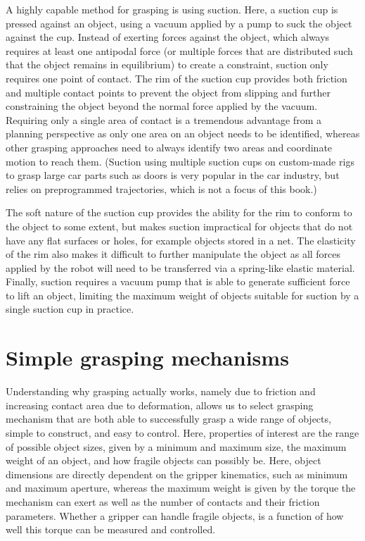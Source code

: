A highly capable method for grasping is using suction. Here, a suction cup is pressed against an object, using a vacuum applied by a pump to suck the object against the cup. Instead of exerting forces against the object, which always requires at least one antipodal force (or multiple forces that are distributed such that the object remains in equilibrium) to create a constraint, suction only requires one point of contact. The rim of the suction cup provides both friction and multiple contact points to prevent the object from slipping and further constraining the object beyond the normal force applied by the vacuum. Requiring only a single area of contact
is a tremendous advantage from a planning perspective as only one area on an object needs to be identified, whereas other grasping approaches need to always identify two areas and coordinate motion to reach them. (Suction using multiple suction cups on custom-made rigs to grasp large car parts such as doors is very popular in the car industry, but relies on preprogrammed trajectories, which is not a focus of this book.)

The soft nature of the suction cup provides the ability for the rim to conform to the object to some extent, but makes suction impractical for objects that do not have any flat surfaces or holes, for example objects stored in a net. The elasticity of the rim also makes it difficult to further manipulate the object as all forces applied by the robot will need to be transferred via a spring-like elastic material. Finally, suction requires a vacuum pump that is able to generate sufficient force to lift an object, limiting the maximum weight of objects suitable for suction by a single suction cup in practice.


\section{Simple grasping mechanisms}\label{sec:simplegrasp}
Understanding why grasping actually works, namely due to friction and increasing contact area due to deformation, allows us to select grasping mechanism that are both able to successfully grasp a wide range of objects, simple to construct, and easy to control. Here, properties of interest are the range of possible object sizes, given by a minimum and maximum size, the maximum weight of an object, and how fragile objects can possibly be. Here, object dimensions are directly dependent on the gripper kinematics, such as minimum and maximum aperture, whereas the maximum weight is given by the torque the mechanism can exert as well as the number of contacts and their friction parameters. Whether a gripper can handle fragile objects, is a function of how well this torque can be measured and controlled.

